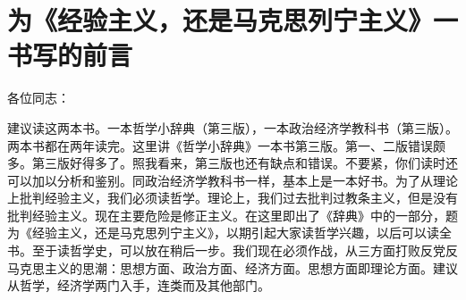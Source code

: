 \section[为《经验主义，还是马克思列宁主义》一书写的前言（一九五九年八月十五日）]{为《经验主义，还是马克思列宁主义》一书写的前言}


各位同志：

建议读这两本书。一本哲学小辞典（第三版），一本政治经济学教科书（第三版）。两本书都在两年读完。这里讲《哲学小辞典》一本书第三版。第一、二版错误颇多。第三版好得多了。照我看来，第三版也还有缺点和错误。不要紧，你们读时还可以加以分析和鉴别。同政治经济学教科书一样，基本上是一本好书。为了从理论上批判经验主义，我们必须读哲学。理论上，我们过去批判过教条主义，但是没有批判经验主义。现在主要危险是修正主义。在这里即出了《辞典》中的一部分，题为《经验主义，还是马克思列宁主义》，以期引起大家读哲学兴趣，以后可以读全书。至于读哲学史，可以放在稍后一步。我们现在必须作战，从三方面打败反党反马克思主义的思潮：思想方面、政治方面、经济方面。思想方面即理论方面。建议从哲学，经济学两门入手，连类而及其他部门。


